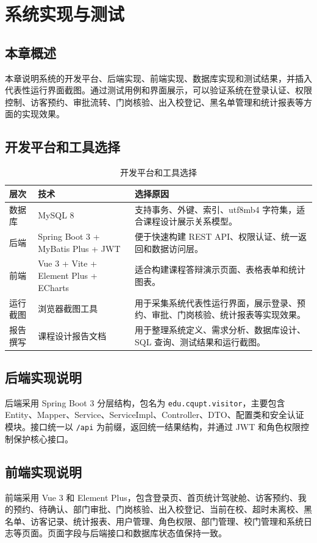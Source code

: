 \section{系统实现与测试}
\subsection{本章概述}
本章说明系统的开发平台、后端实现、前端实现、数据库实现和测试结果，并插入代表性运行界面截图。通过测试用例和界面展示，可以验证系统在登录认证、权限控制、访客预约、审批流转、门岗核验、出入校登记、黑名单管理和统计报表等方面的实现效果。

\subsection{开发平台和工具选择}
\begin{longtable}{>{\raggedright\arraybackslash}p{}>{\raggedright\arraybackslash}p{}>{\raggedright\arraybackslash}p{}}
\caption{开发平台和工具选择}\\
\toprule
层次 & 技术 & 选择原因 \\
\midrule
数据库 & MySQL 8 & 支持事务、外键、索引、utf8mb4 字符集，适合课程设计展示关系模型。 \\
后端 & Spring Boot 3 + MyBatis Plus + JWT & 便于快速构建 REST API、权限认证、统一返回和数据访问层。 \\
前端 & Vue 3 + Vite + Element Plus + ECharts & 适合构建课程答辩演示页面、表格表单和统计图表。 \\
运行截图 & 浏览器截图工具 & 用于采集系统代表性运行界面，展示登录、预约、审批、门岗核验、统计报表等实现效果。 \\
报告撰写 & 课程设计报告文档 & 用于整理系统定义、需求分析、数据库设计、SQL 查询、测试结果和运行截图。 \\
\bottomrule
\end{longtable}
\subsection{后端实现说明}
后端采用 Spring Boot 3 分层结构，包名为 \texttt{edu.cqupt.visitor}，主要包含 Entity、Mapper、Service、ServiceImpl、Controller、DTO、配置类和安全认证模块。接口统一以 \texttt{/api} 为前缀，返回统一结果结构，并通过 JWT 和角色权限控制保护核心接口。

\subsection{前端实现说明}
前端采用 Vue 3 和 Element Plus，包含登录页、首页统计驾驶舱、访客预约、我的预约、待确认、部门审批、门岗核验、出入校登记、当前在校、超时未离校、黑名单、访客记录、统计报表、用户管理、角色权限、部门管理、校门管理和系统日志等页面。页面字段与后端接口和数据库状态值保持一致。

